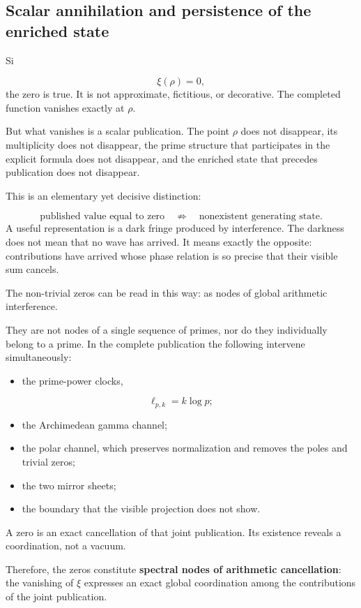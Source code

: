 \subsection{Scalar annihilation and persistence of the enriched state}
Si\par
\[
\xi(\rho)=0,
\]
the zero is true. It is not approximate, fictitious, or decorative. The completed function vanishes exactly at \(\rho\).\par
But what vanishes is a scalar publication. The point \(\rho\) does not disappear, its multiplicity does not disappear, the prime structure that participates in the explicit formula does not disappear, and the enriched state that precedes publication does not disappear.\par
This is an elementary yet decisive distinction:\par
\[
\text{published value equal to zero}
\quad\not\Rightarrow\quad
\text{nonexistent generating state}.
\]
A useful representation is a dark fringe produced by interference. The darkness does not mean that no wave has arrived. It means exactly the opposite: contributions have arrived whose phase relation is so precise that their visible sum cancels.\par
The non-trivial zeros can be read in this way: as nodes of global arithmetic interference.\par
They are not nodes of a single sequence of primes, nor do they individually belong to a prime. In the complete publication the following intervene simultaneously:\par
\begin{itemize}
\item the prime-power clocks,
\end{itemize}
\[
\ell_{p,k}=k\log p;
\]
\begin{itemize}
\item the Archimedean gamma channel;
\item the polar channel, which preserves normalization and removes the poles and trivial zeros;
\item the two mirror sheets;
\item the boundary that the visible projection does not show.
\end{itemize}
A zero is an exact cancellation of that joint publication. Its existence
reveals a coordination, not a vacuum.\par
Therefore, the zeros constitute \textbf{spectral nodes of arithmetic cancellation}: the vanishing of \(\xi\) expresses an exact global coordination among the contributions of the joint publication.\par
{}
